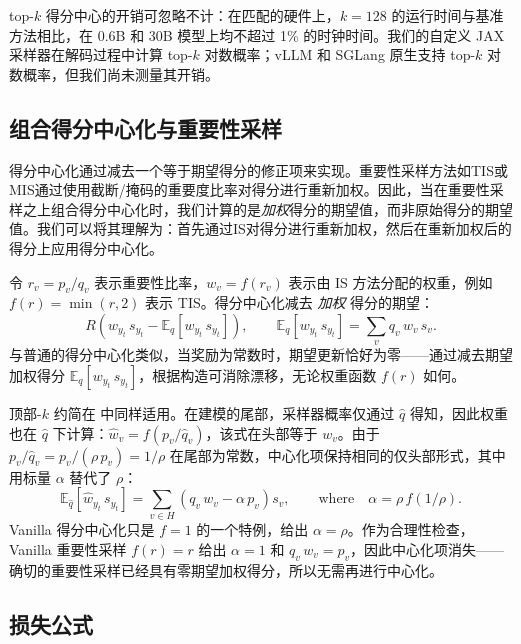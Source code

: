 top-$k$  得分中心的开销可忽略不计：在匹配的硬件上，$k=128$  的运行时间与基准方法相比，在 0.6B 和 30B 模型上均不超过 1\% 的时钟时间。我们的自定义 JAX 采样器在解码过程中计算 top-$k$  对数概率；vLLM 和 SGLang 原生支持 top-$k$  对数概率，但我们尚未测量其开销。

\subsection{组合得分中心化与重要性采样}
\label{sec:is_composition}

得分中心化通过减去一个等于期望得分的修正项来实现。重要性采样方法如TIS或MIS通过使用截断/掩码的重要度比率对得分进行重新加权。因此，当在重要性采样之上组合得分中心化时，我们计算的是\textit{加权}得分的期望值，而非原始得分的期望值。我们可以将其理解为：首先通过IS对得分进行重新加权，然后在重新加权后的得分上应用得分中心化。

\clearpage
令 $r_v = p_v / q_v$ 表示重要性比率，$w_v = f(r_v)$ 表示由 IS 方法分配的权重，例如 $f(r) = \min(r, 2)$ 表示 TIS。得分中心化减去 \textit{加权} 得分的期望：
\begin{equation}
R \left( w_{y_t} \, s_{y_t} - \mathbb{E}_q[w_{y_t} \, s_{y_t}] \right),
\qquad
\mathbb{E}_q[w_{y_t} \, s_{y_t}] = \sum_v q_v \, w_v \, s_v.
\label{eq:sc_is}
\end{equation}
与普通的得分中心化类似，当奖励为常数时，期望更新恰好为零——通过减去期望加权得分 $\mathbb{E}_q[w_{y_t} \, s_{y_t}]$，根据构造可消除漂移，无论权重函数 $f(r)$ 如何。

顶部-$k$ 约简在  中同样适用。在建模的尾部，采样器概率仅通过 $\hat{q}$ 得知，因此权重也在 $\hat{q}$ 下计算：$\hat{w}_v = f(p_v / \hat{q}_v)$，该式在头部等于 $w_v$。由于 $p_v / \hat{q}_v = p_v / (\rho \, p_v) = 1/\rho$ 在尾部为常数，中心化项保持相同的仅头部形式，其中用标量 $\alpha$ 替代了 $\rho$：
\begin{equation}
\mathbb{E}_{\hat{q}}[\hat{w}_{y_t} \, s_{y_t}] = \sum_{v \in H} \left( q_v \, w_v - \alpha \, p_v \right) s_v,
\qquad \textrm{where} \quad
\alpha = \rho \, f(1/\rho).
\label{eq:sc_is_topk}
\end{equation}
Vanilla 得分中心化只是 $f = 1$ 的一个特例，给出 $\alpha = \rho$。作为合理性检查，Vanilla 重要性采样 $f(r) = r$ 给出 $\alpha = 1$ 和 $q_v \, w_v = p_v$，因此中心化项消失——确切的重要性采样已经具有零期望加权得分，所以无需再进行中心化。

\subsection{损失公式}

